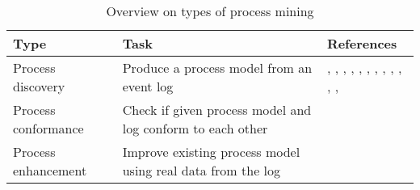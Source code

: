 \begin{table}[!h]
\centering
\caption{Overview on types of process mining}
\label{table:process-mining-overview}
\vspace{5pt}
\begin{tabular}{m{4cm}m{5cm}m{4cm}}
   \toprule
   \textbf{Type} & \textbf{Task} & \textbf{References} \\ \midrule
   Process discovery & Produce a process model from an event log & \cite{van2004workflow}, \cite{van2010process}, \cite{weijters2003rediscovering}, \cite{de2007genetic}, \cite{van2008process}, \cite{gunther2007fuzzy}, \cite{VanderAalst2009}, \cite{Pichler2012}, \cite{Vaculin2011}, \cite{leitner2013case}, \cite{DBLP:journals/istr/BaumgrassS13}, \cite{zhao2014process}, \cite{schoenig_mining_2015} \\ %
   Process conformance & Check if given process model and log conform to each other & \cite{rozinat2008conformance} \\ %
   Process enhancement & Improve existing process model using real data from the log & \cite{VanderAalst2011} \\ \bottomrule
\end{tabular}
\end{table}